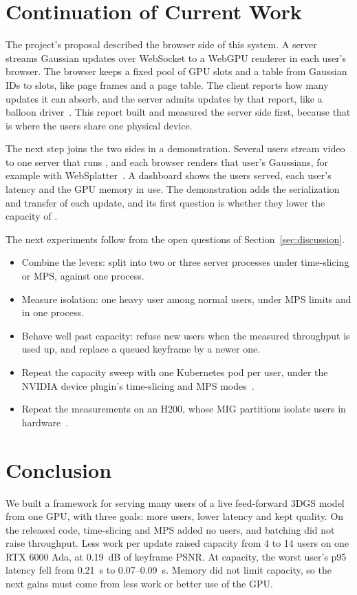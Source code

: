 \section{Continuation of Current Work}
\label{sec:continuation}

The project's proposal described the browser side of this system.
A server streams Gaussian updates over WebSocket to a WebGPU renderer in each user's browser.
The browser keeps a fixed pool of GPU slots and a table from Gaussian IDs to slots, like page frames and a page table.
The client reports how many updates it can absorb, and the server admits updates by that report, like a balloon driver~\cite{waldspurger2002}.
This report built and measured the server side first, because that is where the users share one physical device.

The next step joins the two sides in a demonstration.
Several users stream video to one server that runs \optd{}, and each browser renders that user's Gaussians, for example with WebSplatter~\cite{websplatter2026}.
A dashboard shows the users served, each user's latency and the GPU memory in use.
The demonstration adds the serialization and transfer of each update, and its first question is whether they lower the capacity of \optd{}.

The next experiments follow from the open questions of Section~\ref{sec:discussion}.
\begin{itemize}
\item Combine the levers: split \optd{} into two or three server processes under time-slicing or MPS, against one process.
\item Measure isolation: one heavy user among normal users, under MPS limits and in one process.
\item Behave well past capacity: refuse new users when the measured throughput is used up, and replace a queued keyframe by a newer one.
\item Repeat the capacity sweep with one Kubernetes pod per user, under the NVIDIA device plugin's time-slicing and MPS modes~\cite{k8s_device_plugin}.
\item Repeat the measurements on an H200, whose MIG partitions isolate users in hardware~\cite{nvidia_mig}.
\end{itemize}

\section{Conclusion}

We built a framework for serving many users of a live feed-forward 3DGS model from one GPU, with three goals: more users, lower latency and kept quality.
On the released code, time-slicing and MPS added no users, and batching did not raise throughput. %
Less work per update raised capacity from 4 to 14 users on one RTX 6000 Ada, at 0.19~dB of keyframe PSNR. %
At capacity, the worst user's p95 latency fell from 0.21~s to 0.07--0.09~s. %
Memory did not limit capacity, so the next gains must come from less work or better use of the GPU. %

